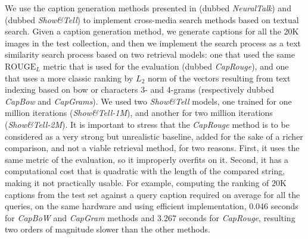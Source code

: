We use the caption generation methods presented in \cite{karpathy2015deep} (dubbed \emph{NeuralTalk}) and \cite{vinyals2015show} (dubbed \emph{Show\&Tell}) to implement cross-media search methods based on textual search.
Given a caption generation method, we generate captions for all the 20K images in the test collection, and then we implement the search process as a text similarity search process based on two retrieval models: one that used the same $\text{ROUGE}_L$ metric that is used for the evaluation (dubbed \emph{CapRouge}), and one that uses a more classic ranking by $L_2$ norm of the vectors resulting from text indexing based on \acrlong{bow} or characters 3- and 4-grams (respectively dubbed \emph{CapBow} and \emph{CapGrams}).
We used two \emph{Show\&Tell} models, one trained for one million iterations (\emph{Show\&Tell-1M}), and another for two million iterations (\emph{Show\&Tell-2M}).
It is important to stress that the \emph{CapRouge} method is to be considered as a very strong but unrealistic baseline, added for the sake of a richer comparison, and not a viable retrieval method, for two reasons.
First, it uses the same metric of the evaluation, so it improperly overfits on it.
Second, it has a computational cost that is quadratic with the length of the compared string, making it not practically usable.
For example, computing the ranking of 20K captions from the test set against a query caption required on average for all the queries, on the same hardware and using efficient implementation, 0.046 seconds for \emph{CapBoW} and \emph{CapGram} methods and 3.267 seconds for \emph{CapRouge}, resulting two orders of magnitude slower than the other methods.

